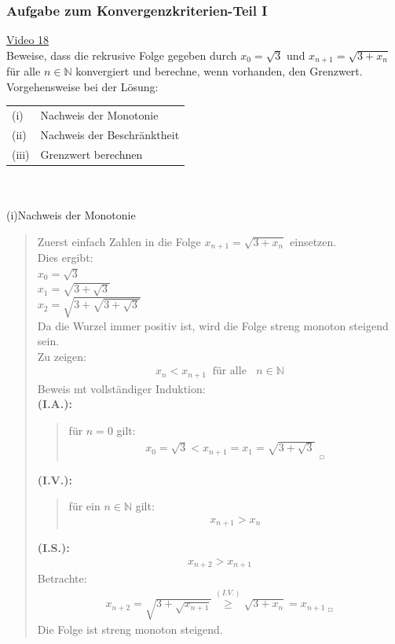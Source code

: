 \subsubsection{Aufgabe zum Konvergenzkriterien-Teil I}
\href{https://youtu.be/fpaipwCojak}{Video 18}\\
Beweise, dass die rekrusive Folge gegeben durch $ x_0=\sqrt{3} $ und $ x_{n+1}=\sqrt{3+x_n} $ \;für alle $ n\in \mathbb{N} $ konvergiert und berechne, wenn vorhanden, den Grenzwert.\\
Vorgehensweise bei der Lösung:\\
\begin{tabular}[t]{ll}%
	(i) & Nachweis der Monotonie  \\
	(ii) & Nachweis der Beschränktheit\\
	(iii) & Grenzwert berechnen \\	
\end{tabular} \\
\\
(i)\;\;Nachweis der Monotonie\\
\begin{quote}
	Zuerst einfach Zahlen in die Folge $ x_{n+1}=\sqrt{3+x_n} $ einsetzen.\\
	Dies ergibt:\\
	$x_0=\sqrt{3}$\\
	$x_1=\sqrt{3+\sqrt{3}}$\\
	$x_2=\sqrt{3+\sqrt{3+\sqrt{3}}}$\\
	Da die Wurzel immer positiv ist, wird die Folge streng monoton steigend sein.\\
	Zu zeigen:
	\begin{align*}
	x_n<x_{n+1}\;\;\text{für alle }\;\;n\in\mathbb{N}
	\end{align*}
	Beweis mt vollständiger Induktion:\\
	\textbullet \;\;\textbf{(I.A.):}\\
	\begin{quote}
		für $ n=0$ gilt:\\
		\begin{align*}
		x_0=\sqrt{3}<x_{n+1}=x_1=\sqrt{3+\sqrt{3}}_{\;\;_{\Square}}
		\end{align*}
	\end{quote}
	\textbullet \;\;\textbf{(I.V.):}\\
	\begin{quote}
		für ein $ n\in\mathbb{N} $ gilt:\\
		\begin{align*}
		x_{n+1}>x_{n}
		\end{align*}
	\end{quote}
	\textbullet \;\;\textbf{(I.S.):}\\
	\begin{align*}
	x_{n+2}>x_{n+1}
	\end{align*}
	Betrachte:
	\begin{align*}
	x_{n+2}=\sqrt{3+\sqrt{x_{n+1}}}\overset{(I.V.)}{\geq}\sqrt{3+x_n}=x_{n+1_{\;\;\Square}}
	\end{align*}
	Die Folge ist streng monoton steigend.
\end{quote}






